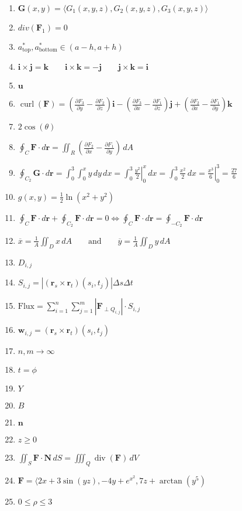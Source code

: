 \documentclass[oneside,10pt,]{article}
\newcommand{\vi}{\mathbf{i}}
\newcommand{\vj}{\mathbf{j}}
\newcommand{\vk}{\mathbf{k}}
\newcommand{\vn}{\mathbf{n}}
\newcommand{\vr}{\mathbf{r}}
\newcommand{\vu}{\mathbf{u}}
\newcommand{\vw}{\mathbf{w}}
\newcommand{\vF}{\mathbf{F}}
\newcommand{\vG}{\mathbf{G}}
\newcommand{\vN}{\mathbf{N}}
\newcommand{\vecmag}[1]{|#1|}
\DeclareMathOperator{\curl}{curl}
\DeclareMathOperator{\divg}{div}
\begin{document}
\begin{enumerate}
\item{}\(\vG(x,y)=\langle{G_1(x,y,z),G_2(x,y,z),G_3(x,y,z)}\rangle\)%
\item{}\(div(\vF_1)=0\)%
\item{}\(a_{\text{top}}^*,a_{\text{bottom}}^* \in (a-h,a+h)\)%
\item{}\(\vi \times \vj = \vk \quad \quad  \vi \times \vk = -\vj \quad \quad  \vj \times \vk = \vi \)%
\item{}\(\vu\)%
\item{}\(\curl(\vF)= \left(\frac{\partial F_3}{\partial y}-\frac{\partial F_2}{\partial z}\right)\vi- \left(\frac{\partial F_3}{\partial x}-\frac{\partial F_1}{\partial z}\right)\vj + \left(\frac{\partial F_2}{\partial x}-\frac{\partial F_1}{\partial y}\right)\vk\)%
\item{}\(2\cos(\theta)\)%
\item{}\(\displaystyle\oint_C\vF\cdot d\vr = \iint_R
\left(\frac{\partial F_2}{\partial x}- \frac{\partial
F_1}{\partial y}\right)\, dA\)%
\item{}\(\oint_{C_2} \vG\cdot d\vr  = \int_0^3\!\int_0^x y\, dy\,
dx = \int_0^3 \left.\frac{y^2}{2}\right|_0^x\, dx = \int_0^3
\frac{x^2}{2}\, dx = \left.\frac{x^3}{6}\right|_0^3 = \frac{27}{6}\)%
\item{}\(g(x,y) = \frac{1}{2}\ln(x^2+y^2)\)%
\item{}\(\oint_C\vF\cdot d\vr + \oint_{C_2}\vF\cdot d\vr =
0\Leftrightarrow \oint_C\vF\cdot d\vr =
\oint_{-C_2}\vF\cdot d\vr\)%
\item{}\(\overline{x} = \frac{1}{A}\iint_D x\, dA \qquad \text{and}\qquad
\overline{y} = \frac{1}{A}\iint_D y\, dA\)%
\item{}\(D_{i,j}\)%
\item{}\(S_{i,j}=\vecmag{(\vr_s \times
\vr_t)(s_i,t_j)}\Delta{s}\Delta{t}\)%
\item{}\(\text{Flux}=\sum_{i=1}^n\sum_{j=1}^m\vecmag{\vF_{\perp
Q_{i,j}}}\cdot S_{i,j}\)%
\item{}\(\vw_{i,j}=(\vr_s \times \vr_t)(s_i,t_j)\)%
\item{}\(n,m\rightarrow\infty\)%
\item{}\(t=\phi\)%
\item{}\(Y\)%
\item{}\(B\)%
\item{}\(\vn\)%
\item{}\(z\geq 0\)%
\item{}\(\iint_{S} \vF \cdot \vN\, dS = \iiint_Q \divg(\vF)\, dV\)%
\item{}\(\vF = \langle 2x+3\sin(yz),-4y+e^{x^2}
, 7z+\arctan(y^5)\)%
\item{}\(0 \leq \rho \leq 3\)%
\end{enumerate}
%
\end{document}
